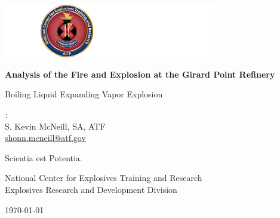 \documentclass[10pt,parskip=half,
toc=sectionentrywithdots,
bibliography=totocnumbered,
captions=tableheading,numbers=noendperiod]{scrartcl}
\begin{document}
    \begin{titlepage}
  \begin{flushright}
    \includegraphics[width=0.7\textwidth]{philadelphia_refinery_files/fig_NCETR.png}
  \end{flushright}

  \begin{center}

  \vspace*{1cm}

  \Huge\textbf{Analysis of the Fire and Explosion at the Girard Point Refinery}

  \vspace{0.5cm}\LARGE{Boiling Liquid Expanding Vapor Explosion}

  \vspace{1.5cm}

  \begin{minipage}{0.8\textwidth}
    \begin{center}
    \begin{minipage}{0.39\textwidth}
    \begin{flushleft} \Large
    \emph{:}\\S. Kevin McNeill, SA, ATF\\\href{mailto:shonn.mcneill@atf.gov}{shonn.mcneill@atf.gov}
    \end{flushleft}
    \end{minipage}
    \hspace{\fill}
    \begin{minipage}{0.39\textwidth}
    \begin{flushright} \Large
    \end{flushright}
    \end{minipage}
    \end{center}
  \end{minipage}

  \vfill

  \begin{minipage}{0.8\textwidth}
  \begin{center}\LARGE{Scientia est Potentia.}
  \end{center}
  \end{minipage}

  \vspace{0.8cm}
      \LARGE{National Center for Explosives Training and Research}\\
      \LARGE{Explosives Research and Development Division}\\

  \vspace{0.4cm}

  \today

  \end{center}
  \end{titlepage}
\end{document}

